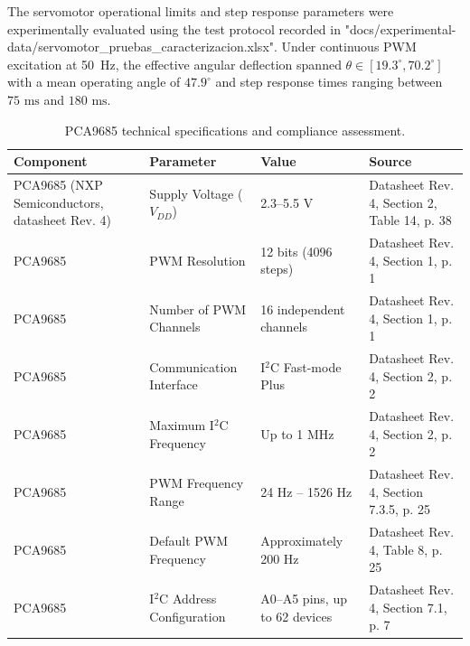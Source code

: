\documentclass[lettersize,journal]{IEEEtran}
\begin{document}
The servomotor operational limits and step response parameters were experimentally evaluated using the test protocol recorded in "docs/experimental-data/servomotor\_pruebas\_caracterizacion.xlsx". Under continuous PWM excitation at 50~Hz, the effective angular deflection spanned $\theta \in [19.3^\circ, 70.2^\circ]$ with a mean operating angle of $47.9^\circ$ and step response times ranging between $75\text{ ms}$ and $180\text{ ms}$.

\begin{table}[ht]
	\centering
	\caption{PCA9685 technical specifications and compliance assessment.}
	\label{tab:PCA9685}
	\scriptsize
	\renewcommand{\arraystretch}{1.2}
	\begin{tabular}{|p{1.4cm}|p{1.8cm}|p{1.8cm}|p{1.8cm}|}
		\hline
		\textbf{Component} &
		\textbf{Parameter} &
		\textbf{Value} &
		\textbf{Source}\\
		\hline
		
		PCA9685 (NXP Semiconductors, datasheet Rev. 4) &
		Supply Voltage ($V_{DD}$) &
		2.3--5.5 V &
		Datasheet Rev. 4, Section 2, Table 14, p. 38 \\
		\hline
		
		PCA9685 &
		PWM Resolution &
		12 bits (4096 steps) &
		Datasheet Rev. 4, Section 1, p. 1 \\
		\hline
		
		PCA9685 &
		Number of PWM Channels &
		16 independent channels &
		Datasheet Rev. 4, Section 1, p. 1 \\
		\hline
		
		PCA9685 &
		Communication Interface &
		I$^2$C Fast-mode Plus &
		Datasheet Rev. 4, Section 2, p. 2 \\
		\hline
		
		PCA9685 &
		Maximum I$^2$C Frequency &
		Up to 1 MHz &
		Datasheet Rev. 4, Section 2, p. 2 \\
		\hline
		
		PCA9685 &
		PWM Frequency Range &
		24 Hz -- 1526 Hz &
		Datasheet Rev. 4, Section 7.3.5, p. 25 \\
		\hline
		
		PCA9685 &
		Default PWM Frequency &
		Approximately 200 Hz &
		Datasheet Rev. 4, Table 8, p. 25 \\
		\hline
		
		PCA9685 &
		I$^2$C Address Configuration &
		A0--A5 pins, up to 62 devices &
		Datasheet Rev. 4, Section 7.1, p. 7 \\
		\hline
		

\end{tabular}
\end{table}
\end{document}
